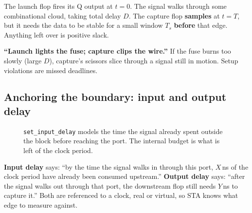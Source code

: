 The launch flop fires its Q output at $t=0$. The signal walks through some combinational cloud, taking total delay $D$. The capture flop \textbf{samples} at $t=T$, but it needs the data to be stable for a small window $T_s$ \textbf{before} that edge. Anything left over is positive slack.

\begin{hook}
\textbf{``Launch lights the fuse; capture clips the wire.''} If the fuse burns too slowly (large $D$), capture's scissors slice through a signal still in motion. Setup violations are missed deadlines.
\end{hook}

\subsection{Anchoring the boundary: input and output delay}

\begin{figure}[h]
\centering
{}
\caption{\texttt{set\_input\_delay} models the time the signal already spent outside the block before reaching the port. The internal budget is what is left of the clock period.}
\end{figure}

\textbf{Input delay} says: ``by the time the signal walks in through this port, $X$\,ns of the clock period have already been consumed upstream.'' \textbf{Output delay} says: ``after the signal walks out through that port, the downstream flop still needs $Y$\,ns to capture it.'' Both are referenced to a clock, real or virtual, so STA knows what edge to measure against.

